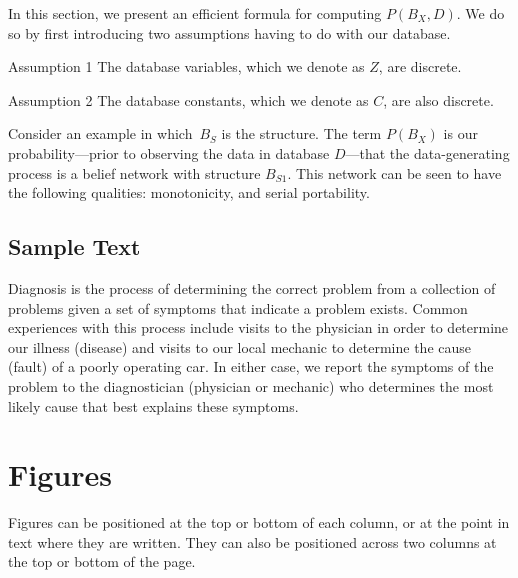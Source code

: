 \begin{article}
In this section, we present an efficient formula for computing $P(B_X, D)$.
We do so by first introducing two assumptions having to do with our
database.

\begin{demo}{Assumption 1}
The database variables, which we denote as $Z$, are discrete.
\end{demo}

\begin{demo}{Assumption 2}
The database constants, which we denote as $C$, are also discrete.
\end{demo}

\begin{example}
Consider an example in which~$B_S$ is the structure.
The term $P(B_X)$ is our probability---prior to observing the data
in database $D$---that the data-generating process is a belief network with
structure $B_{S1}$. This network can be seen to have the following
qualities: monotonicity, and serial portability.
\end{example}

\subsection{Sample Text}
Diagnosis is the process of determining the correct problem from a
collection of problems given a set of symptoms that indicate a
problem exists.  Common experiences with this process include visits
to the physician in order to determine our illness (disease) and
visits to our local mechanic to determine the cause (fault) of a
poorly operating car.  In either case, we report the symptoms of the
problem to the diagnostician (physician or mechanic) who determines
the most likely cause that best explains these symptoms.  

\section{Figures}
Figures can be positioned at the top or bottom of each column,
or at the point in text where they are written. They can
also be positioned across two columns at the top or bottom
of the page. 




\end{article}
